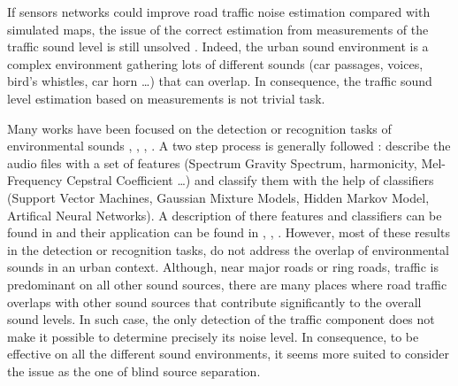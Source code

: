 \documentclass[twocolumn,a4paper,10pt]{article}
\begin{document}
If sensors networks could improve road traffic noise estimation compared with simulated maps, the issue of the correct estimation from  measurements of the traffic sound level is still unsolved \cite{Mioduszewski}. Indeed, the urban sound environment is a complex environment gathering lots of different sounds (car passages, voices, bird's whistles, car horn \dots) that can overlap. In consequence, the traffic sound level estimation based on measurements is not trivial task. 

Many works have been focused on the detection  or recognition tasks of environmental sounds \cite{heittola_sound_2011},  \cite{defreville_automatic_2006},  \cite{dufaux_automatic_2000}, \cite{chu_environmental_2009}. A two step process is generally followed : describe the audio files with a set of features (Spectrum Gravity Spectrum, harmonicity, Mel-Frequency Cepstral Coefficient \dots) and classify them with the help of classifiers (Support Vector Machines, Gaussian Mixture Models, Hidden Markov Model, Artifical Neural Networks). A description of there features and classifiers can be found in \cite{cowling_comparison_2003} and their application can be found in \cite{shen_environmental_2012}, \cite{beritelli_pattern_2008}, \cite{couvreur_automatic_2004}.
However, most of these results in the detection or recognition tasks, do not address the overlap of environmental sounds in an urban context. Although, near major roads or ring roads, traffic is predominant on all other sound sources, there are many places where road traffic overlaps with other sound sources that contribute significantly to the overall sound levels. In such case, the only detection of the traffic component does not make it possible to determine precisely its noise level. In consequence, to be effective on all the different sound environments, it seems more suited to consider the issue as the one of blind source separation.
\end{document}
